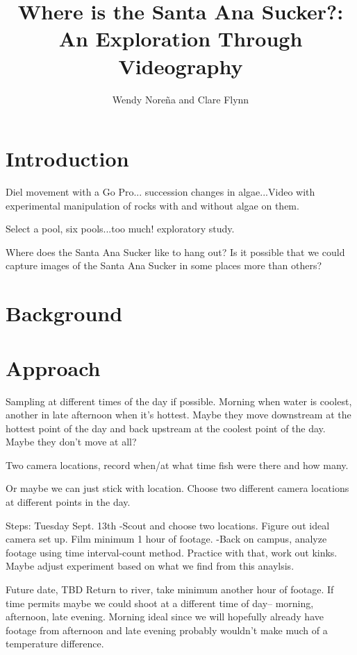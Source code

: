 \documentclass{tufte-handout}\usepackage[]{graphicx}\usepackage[]{color}
\title{Where is the Santa Ana Sucker?: An Exploration Through Videography}
\author{Wendy Nore\~{n}a and Clare Flynn}
\begin{document}

\maketitle

\section{Introduction}


  Diel movement with a Go Pro... succession changes in algae...Video with experimental manipulation of rocks with and without algae on them. 
  
  Select a pool, six pools...too much!  exploratory study.
  
  
Where does the Santa Ana Sucker like to hang out? Is it possible that we could capture images of the Santa Ana Sucker in some places more than others?

\section{Background}


\section{Approach}

Sampling at different times of the day if possible. Morning when water is coolest, another in late afternoon when it's hottest. Maybe they move downstream at the hottest point of the day and back upstream at the coolest point of the day. Maybe they don't move at all?

Two camera locations, record when/at what time fish were there and how many. 


Or maybe we can just stick with location. Choose two different camera locations at different points in the day. 


Steps:
Tuesday Sept. 13th
-Scout and choose two locations. Figure out ideal camera set up. Film minimum 1 hour of footage.
-Back on campus, analyze footage using time interval-count method. Practice with that, work out kinks. Maybe adjust experiment based on what we find from this anaylsis.

Future date, TBD
Return to river, take minimum another hour of footage. If time permits maybe we could shoot at a different time of day-- morning, afternoon, late evening. Morning ideal since we will hopefully already have footage from afternoon and late evening probably wouldn't make much of a temperature difference. 
\end{document}
